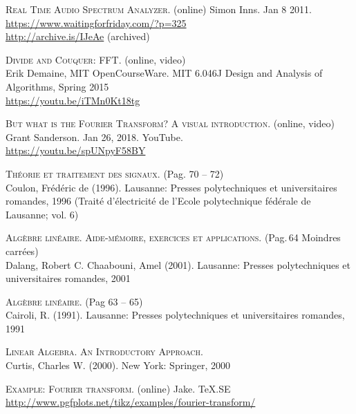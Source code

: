 \listoffigures
\begingroup
\let\clearpage\relax
\vspace{15mm}
\listoftables
\endgroup

\begin{thebibliography}{2}

    \textsc{Real Time Audio Spectrum Analyzer}. (online) 
    Simon Inns. Jan 8 2011. \\
    \url{https://www.waitingforfriday.com/?p=325} \\
    \url{http://archive.is/IJeAe} (archived)

    \textsc{Divide and Couquer: FFT}. (online, video) \\
    Erik Demaine, MIT OpenCourseWare.
    MIT 6.046J Design and Analysis of Algorithms, Spring 2015 \\
    \url{https://youtu.be/iTMn0Kt18tg}

    \textsc{But what is the Fourier Transform? A visual introduction}. (online, video) \\
    Grant Sanderson. Jan 26, 2018. YouTube. \\
    \url{https://youtu.be/spUNpyF58BY}

    \textsc{Théorie et traitement des signaux}. (Pag. 70 -- 72) \\
    Coulon, Frédéric de (1996).
    Lausanne: Presses polytechniques et universitaires romandes, 1996
    (Traité d'électricité de l'Ecole polytechnique fédérale de Lausanne; vol. 6)

    \textsc{Algèbre linéaire. Aide-mémoire, exercices et applications}. (Pag.\,64 Moindres carrées) \\
    Dalang, Robert C. Chaabouni, Amel (2001). 
    Lausanne: Presses polytechniques et universitaires romandes, 2001

    \textsc{Algèbre linéaire}. (Pag 63 -- 65)\\
    Cairoli, R. (1991).
    Lausanne: Presses polytechniques et universitaires romandes, 1991

    \textsc{Linear Algebra. An Introductory Approach.} \\
    Curtis, Charles W. (2000).
    New York: Springer, 2000


    \textsc{Example: Fourier transform}. (online)
    Jake. TeX.SE \\
    \url{http://www.pgfplots.net/tikz/examples/fourier-transform/}

\end{thebibliography}
